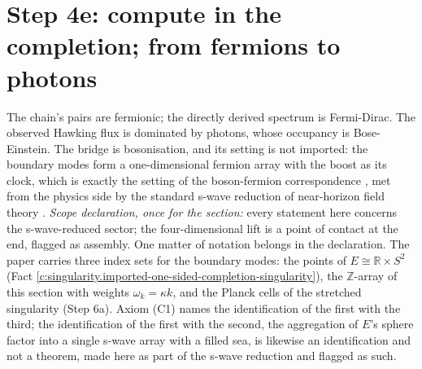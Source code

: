\documentclass[11pt]{article}
\theoremstyle{definition}
\theoremstyle{plain}
\providecommand{\R}{}\renewcommand{\R}{\mathbb{R}}
\begin{document}
\section{Step 4e: compute in the completion; from fermions to photons}

\label{c:note.singularity.setting-step-4e-compute-completion-fermions}
The chain's pairs are fermionic; the directly derived spectrum is Fermi-Dirac. The observed Hawking flux is dominated by photons, whose occupancy is Bose-Einstein. The bridge is bosonisation, and its setting is not imported: the boundary modes form a one-dimensional fermion array with the boost as its clock, which is exactly the setting of the boson-fermion correspondence \cite{PressleySegal1986}, met from the physics side by the standard s-wave reduction of near-horizon field theory \cite{RW2005}. \emph{Scope declaration, once for the section:} every statement here concerns the s-wave-reduced sector; the four-dimensional lift is a point of contact at the end, flagged as assembly. One matter of notation belongs in the declaration. The paper carries three index sets for the boundary modes: the points of $E \cong \R \times S^{2}$ (Fact \ref{c:singularity.imported-one-sided-completion-singularity}), the $\mathbb{Z}$-array of this section with weights $\omega_k = \kappa k$, and the Planck cells of the stretched singularity (Step 6a). Axiom (C1) names the identification of the first with the third; the identification of the first with the second, the aggregation of $E$'s sphere factor into a single s-wave array with a filled sea, is likewise an identification and not a theorem, made here as part of the s-wave reduction and flagged as such.
\end{document}
